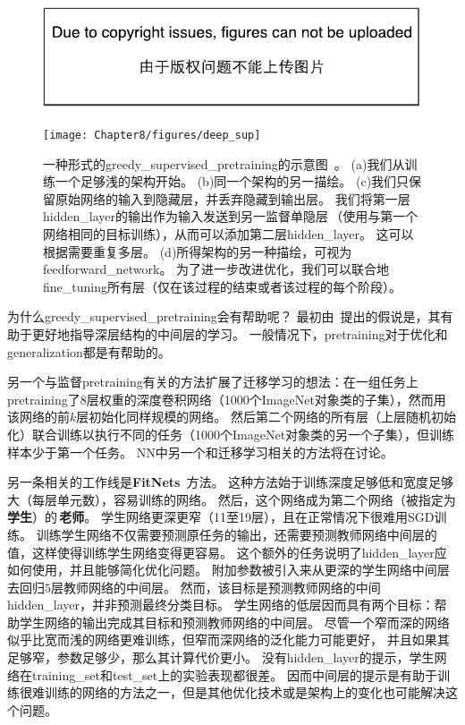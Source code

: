 \begin{figure}[!htb]
\ifOpenSource
\centerline{\includegraphics{figure.pdf}}
\else
\centerline{\texttt{[image: Chapter8/figures/deep\_sup]}}
\fi
\caption{一种形式的\gls{greedy_supervised_pretraining}的示意图~\citep{Bengio-nips-2006-small}。
(a)我们从训练一个足够浅的架构开始。
(b)同一个架构的另一描绘。
(c)我们只保留原始网络的输入到隐藏层，并丢弃隐藏到输出层。 
我们将第一层\gls{hidden_layer}的输出作为输入发送到另一监督单隐层\,（使用与第一个网络相同的目标训练），从而可以添加第二层\gls{hidden_layer}。 
这可以根据需要重复多层。
(d)所得架构的另一种描绘，可视为\gls{feedforward_network}。 
为了进一步改进优化，我们可以联合地\gls{fine_tuning}所有层（仅在该过程的结束或者该过程的每个阶段）。
}
\label{fig:chap8_deep_sup}
\end{figure}


为什么\gls{greedy_supervised_pretraining}会有帮助呢？
最初由~\cite{Bengio-nips-2006}提出的假说是，其有助于更好地指导深层结构的中间层的学习。
一般情况下，\gls{pretraining}对于优化和\gls{generalization}都是有帮助的。

另一个与监督\gls{pretraining}有关的方法扩展了迁移学习的想法：\cite{yosinski-nips2014}在一组任务上\gls{pretraining}了$8$层权重的深度卷积网络（1000个ImageNet对象类的子集），然而用该网络的前$k$层初始化同样规模的网络。
然后第二个网络的所有层（上层随机初始化）联合训练以执行不同的任务（1000个ImageNet对象类的另一个子集），但训练样本少于第一个任务。
\gls{NN}中另一个和迁移学习相关的方法将在讨论。

另一条相关的工作线是\textbf{FitNets}~\citep{Romero-et-al-ICLR2015-small}方法。
这种方法始于训练深度足够低和宽度足够大（每层单元数），容易训练的网络。
然后，这个网络成为第二个网络（被指定为\,\textbf{学生}）的\,\textbf{老师}。
学生网络更深更窄（11至19层），且在正常情况下很难用SGD训练。
训练学生网络不仅需要预测原任务的输出，还需要预测教师网络中间层的值，这样使得训练学生网络变得更容易。
这个额外的任务说明了\gls{hidden_layer}应如何使用，并且能够简化优化问题。
附加参数被引入来从更深的学生网络中间层去回归$5$层教师网络的中间层。
然而，该目标是预测教师网络的中间\gls{hidden_layer}，并非预测最终分类目标。
学生网络的低层因而具有两个目标：帮助学生网络的输出完成其目标和预测教师网络的中间层。
尽管一个窄而深的网络似乎比宽而浅的网络更难训练，但窄而深网络的泛化能力可能更好，
并且如果其足够窄，参数足够少，那么其计算代价更小。
没有\gls{hidden_layer}的提示，学生网络在\gls{training_set}和\gls{test_set}上的实验表现都很差。
因而中间层的提示是有助于训练很难训练的网络的方法之一，但是其他优化技术或是架构上的变化也可能解决这个问题。

